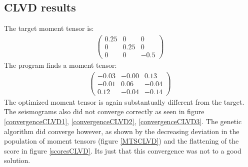 \documentclass{article}
\begin{document}
\subsection*{CLVD results}
The target moment tensor is:
\begin{gather}
	\begin{pmatrix}
	0.25 & 0 & 0 \\
	0 & 0.25 & 0 \\
	0 & 0 & -0.5 
	\end{pmatrix}
\end{gather}
The program finds a moment tensor:
\begin{gather}
	\begin{pmatrix}
	-0.03 & -0.00 & 0.13 \\
	-0.01 & 0.06 & -0.04 \\
	0.12 & -0.04 & -0.14 
	\end{pmatrix}
\end{gather}
The optimized moment tensor is again substantually different from the target. The seismograms also did not converge correctly as seen in figure \ref{convergenceCLVD1}, \ref{convergenceCLVD2}, \ref{convergenceCLVD3}. The genetic algorithm did converge however, as shown by the decreasing deviation in the population of moment tensors (figure \ref{MTSCLVD}) and the flattening of the score in figure \ref{scoresCLVD}. Its just that this convergence was not to a good solution.
\end{document}
